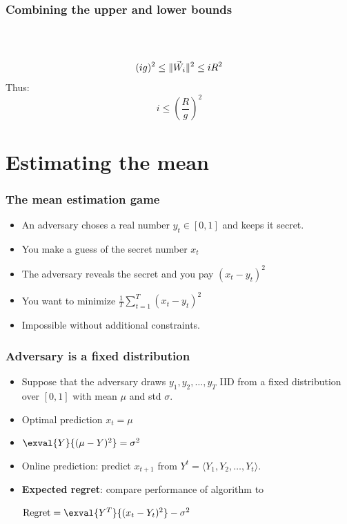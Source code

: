 \documentclass{beamer}
\begin{document}
\begin{frame}
\frametitle{Combining the upper and lower bounds}
~\\
~\\
\pause
$$(ig)^2 \leq \|\vec{W}_i\|^2 \leq i R^2$$
\pause
Thus:
$$ i \leq \left(\frac{R}{g} \right)^2 $$
\end{frame}

\section{Estimating the mean}

\begin{frame}
\frametitle{The mean estimation game}
\begin{itemize}
\item 
An adversary choses a real number $y_t \in [0,1]$ and keeps it secret.
\item
You make a guess of the secret number $x_t$
\item
The adversary reveals the secret and you pay $(x_t-y_t)^2$ 
\end{itemize}
\begin{itemize}
\item You want to minimize $\frac{1}{T}\sum_{t=1}^T \left(x_t-y_t \right)^2$
\item Impossible without additional constraints.
\end{itemize}
\end{frame}

\begin{frame}
\frametitle{Adversary is a fixed distribution}
\begin{itemize}
\item 
Suppose that the adversary draws $y_1,y_2,\ldots,y_T$ IID from a fixed
distribution over $[0,1]$ with mean $\mu$ and std $\sigma$.
\item
Optimal prediction $x_t = \mu$ 
\item 
  $\exval{Y}{(\mu-Y)^2} = \sigma^2$
\item Online prediction: predict $x_{t+1}$ from $Y^t = \langle
  Y_1,Y_2,\ldots,Y_t \rangle$.
\item {\bf Expected regret}: compare performance of algorithm to
  
  $ \regret = \exval{Y^T}{(x_t-Y_t)^2} - \sigma^2$
\end{itemize}
\end{frame}
\end{document}
